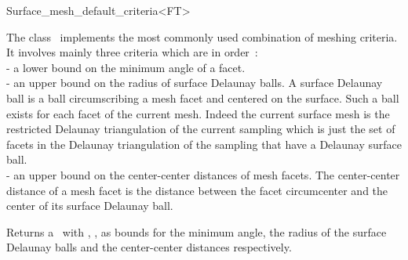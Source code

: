 

\begin{ccRefClass}{Surface_mesh_default_criteria<FT>}  %


\ccDefinition
  
The class \ccRefName\  implements  the most commonly used combination
of meshing criteria. It involves mainly three criteria which are
in order~: \\
- a lower bound on the minimum angle of a facet. \\
- an upper bound on the radius of surface Delaunay balls.
 A surface Delaunay ball is a  ball circumscribing  a mesh facet 
and  centered on the surface. Such a ball exists for each facet
of the current mesh.
Indeed  the current surface mesh
is  the restricted Delaunay triangulation of the current sampling
which is just the set of facets in the Delaunay triangulation of
the sampling  that  have a Delaunay surface ball. \\
- an upper bound on the center-center distances of mesh facets.
  The center-center distance of a mesh facet 
  is the distance between the facet circumcenter and the 
  center of its  surface Delaunay ball. 



\ccIsModel




\ccCreation
{}  %

{Returns a \ccRefName\ with , ,
 as bounds for the minimum angle,
the radius of the surface Delaunay balls 
and the center-center distances respectively.}



\end{ccRefClass}

